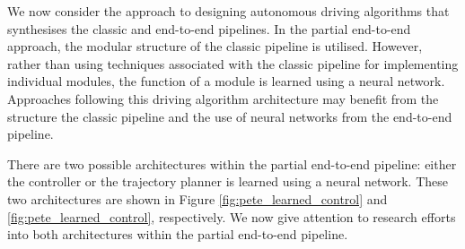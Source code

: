 
We now consider the approach to designing autonomous driving algorithms that synthesises the classic and end-to-end pipelines. 
In the partial end-to-end approach, the modular structure of the classic pipeline is utilised.
However, rather than using techniques associated with the classic pipeline for implementing individual modules, the function of a module is learned using a neural network.
Approaches following this driving algorithm architecture may benefit from the structure the classic pipeline and the use of neural networks from the end-to-end pipeline.

There are two possible architectures within the partial end-to-end pipeline: either the controller or the trajectory planner is learned using a neural network. 
These two architectures are shown in Figure \ref{fig:pete_learned_control} and \ref{fig:pete_learned_control}, respectively.
We now give attention to research efforts into both architectures within the partial end-to-end pipeline.



\begin{landscape}
    
\end{landscape}


